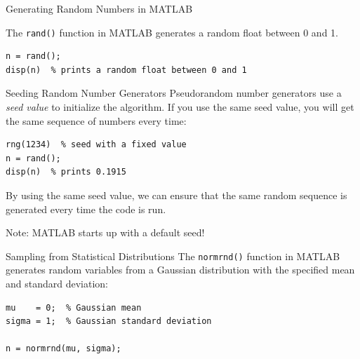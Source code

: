 \documentclass{beamer}
\newcommand{\code}[1]{{\color{blue}\texttt{#1}}}
\begin{document}
\begin{frame}[fragile]{Generating Random Numbers in MATLAB}

The \code{rand()} function in MATLAB generates a random float between 0 and 1.

\begin{lstlisting}[style=matlab]
n = rand();
disp(n)  % prints a random float between 0 and 1
\end{lstlisting}

\end{frame}

\begin{frame}[fragile]{Seeding Random Number Generators}
    Pseudorandom number generators use a \emph{seed value} to initialize the algorithm. If you use the same seed value, you will get the same sequence of numbers every time:

\begin{lstlisting}[style=matlab]
rng(1234)  % seed with a fixed value
n = rand();
disp(n)  % prints 0.1915
\end{lstlisting}

By using the same seed value, we can ensure that the same random sequence is generated every time the code is run.

Note: MATLAB starts up with a default seed!

\end{frame}

\begin{frame}[fragile]{Sampling from Statistical Distributions}
The \code{normrnd()} function in MATLAB generates random variables from a Gaussian distribution with the specified mean and standard deviation:

\begin{lstlisting}[style=matlab]
mu    = 0;  % Gaussian mean
sigma = 1;  % Gaussian standard deviation

n = normrnd(mu, sigma);
\end{lstlisting}

\end{frame}
\end{document}
